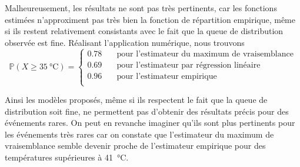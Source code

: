 \documentclass[../report.tex]{subfiles}
\begin{document}
\par Malheureusement, les résultats ne sont pas très pertinents, car les fonctions estimées n'approximent pas très bien la fonction de répartition empirique, même si ils restent relativement consistants avec le fait que la queue de distribution observée est fine. Réalisant l'application numérique, nous trouvons
\begin{displaymath}
\mathbb{P} \left( X \geq \SI{35}{\celsius} \right) = 
	\begin{cases}
	0.78 \quad &\text{pour l'estimateur du maximum de vraisemblance} \\
	0.69 \quad &\text{pour l'estimateur par régression linéaire} \\
	0.96 \quad &\text{pour l'estimateur empirique} \\
	\end{cases}
\end{displaymath}

\par Ainsi les modèles proposés, même si ils respectent le fait que la queue de distribution soit fine, ne permettent pas d'obtenir des résultats précis pour des événements rares. On peut en revanche imaginer qu'ils sont plus pertinents pour les événements très rares car on constate que l'estimateur du maximum de vraisemblance semble devenir proche de l'estimateur empirique pour des températures supérieures à \SI{41}{\celsius}.
\end{document}
